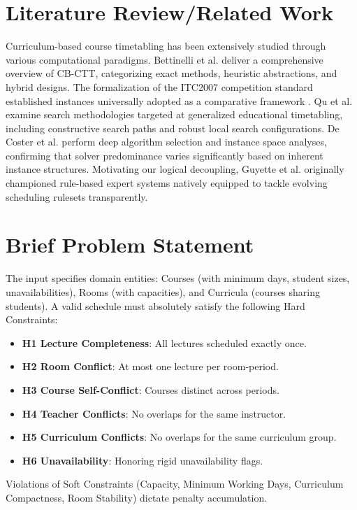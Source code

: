 \documentclass[conference]{IEEEtran}
\begin{document}
\section{Literature Review/Related Work}
Curriculum-based course timetabling has been extensively studied through various computational paradigms. Bettinelli et al. \cite{bettinelli2015overview} deliver a comprehensive overview of CB-CTT, categorizing exact methods, heuristic abstractions, and hybrid designs. The formalization of the ITC2007 competition standard established instances universally adopted as a comparative framework \cite{itc2007}. Qu et al. \cite{qu2009survey} examine search methodologies targeted at generalized educational timetabling, including constructive search paths and robust local search configurations. De Coster et al. \cite{de2022algorithm} perform deep algorithm selection and instance space analyses, confirming that solver predominance varies significantly based on inherent instance structures. Motivating our logical decoupling, Guyette et al. \cite{guyette1994rule} originally championed rule-based expert systems natively equipped to tackle evolving scheduling rulesets transparently.

\section{Brief Problem Statement}
The input specifies domain entities: Courses (with minimum days, student sizes, unavailabilities), Rooms (with capacities), and Curricula (courses sharing students). A valid schedule must absolutely satisfy the following Hard Constraints: 
\begin{itemize}
    \item \textbf{H1 Lecture Completeness}: All lectures scheduled exactly once.
    \item \textbf{H2 Room Conflict}: At most one lecture per room-period.
    \item \textbf{H3 Course Self-Conflict}: Courses distinct across periods.
    \item \textbf{H4 Teacher Conflicts}: No overlaps for the same instructor.
    \item \textbf{H5 Curriculum Conflicts}: No overlaps for the same curriculum group.
    \item \textbf{H6 Unavailability}: Honoring rigid unavailability flags.
\end{itemize}

Violations of Soft Constraints (Capacity, Minimum Working Days, Curriculum Compactness, Room Stability) dictate penalty accumulation.
\end{document}
